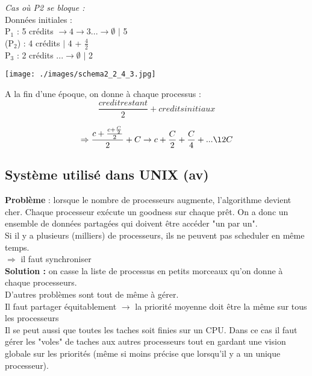 \documentclass[12pt,a4paper]{report}
\begin{document}
\textit{Cas où P2 se bloque :}\\

Données initiales : \\
P$_1$ : 5 crédits \textbf{$\rightarrow 4 \rightarrow 3 ... \rightarrow \emptyset$} \hspace*{1.05cm} $\mid$ 5\\
(P$_2$) : 4 crédits \hspace*{3.68cm} $\mid$ 4 + $\frac{4}{2}$\\
P$_3$ : 2 crédits \textbf{$... \rightarrow \emptyset$} \hspace*{2.65cm} $\mid$ 2
\begin{center}
\texttt{[image: ./images/schema2\_2\_4\_3.jpg]}
\end{center}


A la fin d'une époque, on donne à chaque processus :\\
$$\frac{credit restant}{2} + credits initiaux $$

 $$\Rightarrow \frac{c +\frac{c + \frac{C}{2}}{2}}{2} + C \rightarrow c + \frac{C}{2} +  \frac{C}{4} + ... \l 2C$$

\subsection{Système utilisé dans UNIX (av)}
\textbf{Problème} : lorsque le nombre de processeurs augmente, l'algorithme devient cher. Chaque processeur exécute un goodness sur chaque prêt. On a donc un ensemble de données partagées qui doivent être accéder "un par un".\\
Si il y a plusieurs (milliers) de processeurs, ils ne peuvent pas scheduler en même temps.\\

$\Rightarrow$ il faut synchroniser\\

\textbf{Solution :} on casse la liste de processus en petits morceaux qu'on donne à chaque processeurs.\\
D'autres problèmes sont tout de même à gérer.\\

Il faut partager équitablement $\rightarrow$ la priorité moyenne doit être la même sur tous les processeurs\\
Il se peut aussi que toutes les taches soit finies sur un CPU. Dans ce cas il faut gérer les "voles" de taches aux autres processeurs tout en gardant une vision globale sur les priorités (même si moins précise que lorsqu'il y a un unique processeur). 
\end{document}
